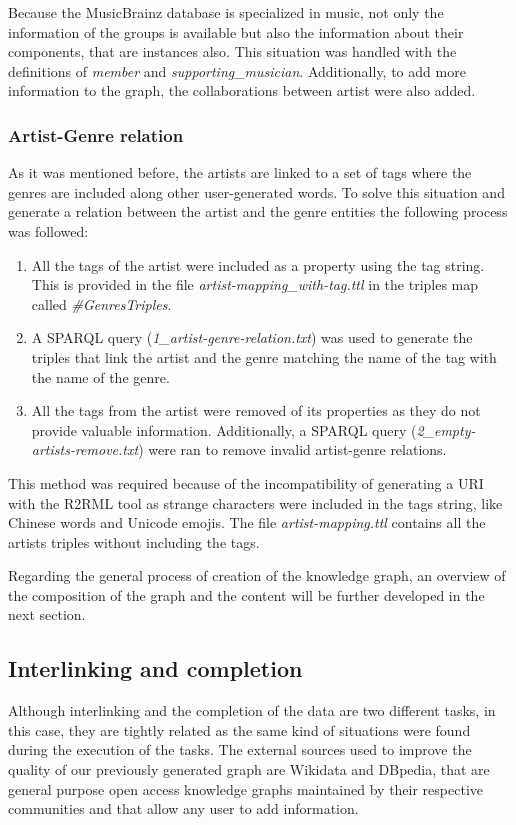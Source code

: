 Because the MusicBrainz database is specialized in music, not only the information of the groups is available but also the information about their components, that are instances also. This situation was handled with the definitions of \textit{member} and \textit{supporting\_musician}. Additionally, to add more information to the graph, the collaborations between artist were also added. 

\subsubsection{Artist-Genre relation}
As it was mentioned before, the artists are linked to a set of tags where the genres are included along other user-generated words.
To solve this situation and generate a relation between the artist and the genre entities the following process was followed:

\begin{enumerate}
\item All the tags of the artist were included as a property using the tag string. This is provided in the file \textit{artist-mapping\_with-tag.ttl} in the triples map called \textit{\#GenresTriples}.

\item A SPARQL query (\textit{1\_artist-genre-relation.txt}) was used to generate the triples that link the artist and the genre matching the name of the tag with the name of the genre.

\item All the tags from the artist were removed of its properties as they do not provide valuable information.
Additionally, a SPARQL query (\textit{2\_empty-artists-remove.txt}) were ran to remove invalid artist-genre relations.
\end{enumerate}

This method was required because of the incompatibility of generating a URI with the R2RML tool as strange characters were included in the tags string, like Chinese words and Unicode emojis. 
The file \textit{artist-mapping.ttl} contains all the artists triples without including the tags.

Regarding the general process of creation of the knowledge graph, an overview of the composition of the graph and the content will be further developed in the next section.

\subsection{Interlinking and completion}
Although interlinking and the completion of the data are two different tasks, in this case, they are tightly related as the same kind of situations were found during the execution of the tasks.
The external sources used to improve the quality of our previously generated graph are Wikidata and DBpedia, that are general purpose open access knowledge graphs maintained by their respective communities and that allow any user to add information. 

